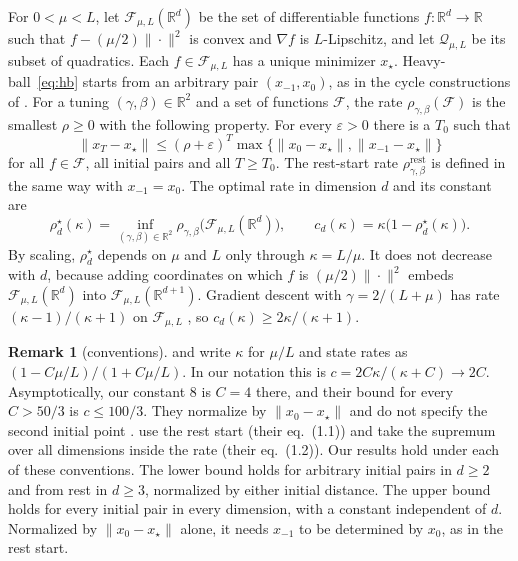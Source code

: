 \documentclass[11pt, a4paper]{article}
\theoremstyle{definition}
\newtheorem{remark}{Remark}
\newcommand{\R}{\mathbb{R}}
\newcommand{\F}{\mathcal{F}_{\mu,L}}
\newcommand{\Qc}{\mathcal{Q}_{\mu,L}}
\newcommand{\eps}{\varepsilon}
\newcommand{\rest}{\mathrm{rest}}
\begin{document}
For $0<\mu<L$, let $\F(\R^d)$ be the set of differentiable functions $f:\R^d\to\R$ such that
$f-(\mu/2)\|\cdot\|^2$ is convex and $\nabla f$ is $L$-Lipschitz, and let $\Qc$ be its subset of quadratics. Each
$f\in\F$ has a unique minimizer $x_\star$. Heavy-ball~\eqref{eq:hb} starts from an arbitrary pair $(x_{-1},x_0)$, as in
the cycle constructions of \citet{goujaud2025provable}. For a tuning $(\gamma,\beta)\in\R^2$ and a set of functions
$\mathcal F$, the rate $\rho_{\gamma,\beta}(\mathcal F)$ is the smallest $\rho\ge0$ with the following property. For
every $\eps>0$ there is a $T_0$ such that
\begin{equation}
  \|x_T-x_\star\|\le(\rho+\eps)^T\max\bigl\{\|x_0-x_\star\|,\|x_{-1}-x_\star\|\bigr\}
  \label{eq:rate}
\end{equation}
for all $f\in\mathcal F$, all initial pairs and all $T\ge T_0$. The rest-start rate $\rho^\rest_{\gamma,\beta}$ is
defined in the same way with $x_{-1}=x_0$. The optimal rate in dimension $d$ and its constant are
\[
  \rho^\star_d(\kappa)=\inf_{(\gamma,\beta)\in\R^2}\rho_{\gamma,\beta}\bigl(\F(\R^d)\bigr),\qquad
  c_d(\kappa)=\kappa\bigl(1-\rho^\star_d(\kappa)\bigr).
\]
By scaling, $\rho^\star_d$ depends on $\mu$ and $L$ only through $\kappa=L/\mu$. It does not decrease with $d$, because
adding coordinates on which $f$ is $(\mu/2)\|\cdot\|^2$ embeds $\F(\R^d)$ into $\F(\R^{d+1})$. Gradient descent with
$\gamma=2/(L+\mu)$ has rate $(\kappa-1)/(\kappa+1)$ on $\F$ \citep[Thm.~2.1.15]{nesterov2018lectures}, so
$c_d(\kappa)\ge2\kappa/(\kappa+1)$.

\begin{remark}[conventions]
  \label{rem:conventions}
  \citet{goujaud2025provable} and \citet{goujaud2024thesis} write $\kappa$ for $\mu/L$ and state rates as
  $(1-C\mu/L)/(1+C\mu/L)$. In our notation this is $c=2C\kappa/(\kappa+C)\to2C$. Asymptotically, our constant
  $8$ is $C=4$ there, and their bound for every $C>50/3$ is $c\le100/3$. They normalize by $\|x_0-x_\star\|$ and do not
  specify the second initial point \citep[Defs.~1.3--1.5]{goujaud2025provable}.  use the rest
  start (their eq.~(1.1)) and take the supremum over all dimensions inside the rate (their eq.~(1.2)). Our results hold under each of
  these conventions. The lower bound holds for arbitrary initial pairs in $d\ge2$ and from rest in $d\ge3$, normalized
  by either initial distance. The upper bound holds for every initial pair in every dimension, with a constant
  independent of $d$. Normalized by $\|x_0-x_\star\|$ alone, it needs $x_{-1}$ to be determined by $x_0$, as in the rest
  start.
\end{remark}
\end{document}
